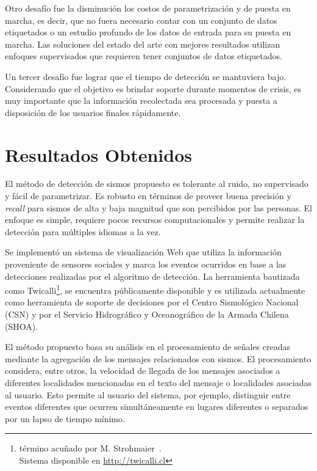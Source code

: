 Otro desafío fue la disminución los costos de parametrización y de puesta en marcha, es decir, que no fuera necesario contar con un conjunto de datos etiquetados o un estudio profundo de los datos de entrada para su puesta en marcha.
%
Las soluciones del estado del arte con mejores resultados utilizan enfoques supervisados que requieren tener conjuntos de datos etiquetados. 


Un tercer desafío fue lograr que el tiempo de detección se mantuviera bajo. Considerando que el objetivo es brindar soporte durante momentos de crisis, es muy importante que la información recolectada sea procesada y puesta a disposición de los usuarios finales rápidamente.


\section{Resultados Obtenidos}

El método de detección de sismos propuesto es tolerante al ruido, no supervisado y fácil de parametrizar. 
%
Es robusto en términos de proveer buena precisión y {\em recall} para sismos de alta y baja magnitud que son percibidos por las personas.
%
El enfoque es simple, requiere pocos recursos computacionales y permite realizar la detección para múltiples idiomas a la vez.


Se implementó un sistema de visualización Web que utiliza la información proveniente de sensores sociales y marca los eventos ocurridos en base a las detecciones realizadas por el algoritmo de detección. 
%
La herramienta bautizada como Twicalli\footnote{término acuñado por M. Strohmaier~\cite{Strohmaier2010Twicalli}.\\Sistema disponible en \url{http://twicalli.cl}}, 
se encuentra públicamente disponible y es utilizada actualmente como herramienta de soporte de decisiones por el Centro Sismológico Nacional (CSN) y por el Servicio Hidrográfico y Oceanográfico de la Armada Chilena (SHOA).


El método propuesto basa su análisis en el procesamiento de señales creadas mediante la agregación de los mensajes relacionados con sismos. 
%
El procesamiento considera, entre otros, la velocidad de llegada de los mensajes asociados a diferentes localidades mencionadas en el texto del mensaje o localidades asociadas al usuario.
%
Esto permite al usuario del sistema, por ejemplo, distinguir entre eventos diferentes que ocurren simultáneamente en lugares diferentes o separados por un lapso de tiempo mínimo.
%


